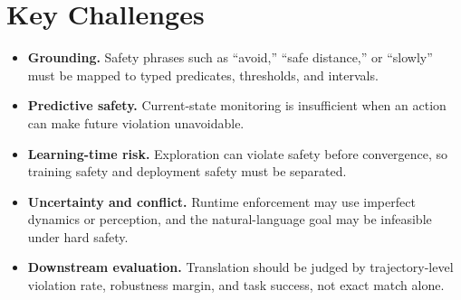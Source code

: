 \documentclass[letterpaper,10pt,twocolumn]{article}
\begin{document}
\section{Key Challenges}
\begin{itemize}
    \item \textbf{Grounding.} Safety phrases such as ``avoid,'' ``safe distance,'' or ``slowly'' must be mapped to typed predicates, thresholds, and intervals.
    \item \textbf{Predictive safety.} Current-state monitoring is insufficient when an action can make future violation unavoidable.
    \item \textbf{Learning-time risk.} Exploration can violate safety before convergence, so training safety and deployment safety must be separated.
    \item \textbf{Uncertainty and conflict.} Runtime enforcement may use imperfect dynamics or perception, and the natural-language goal may be infeasible under hard safety.
    \item \textbf{Downstream evaluation.} Translation should be judged by trajectory-level violation rate, robustness margin, and task success, not exact match alone.
\end{itemize}
\end{document}
